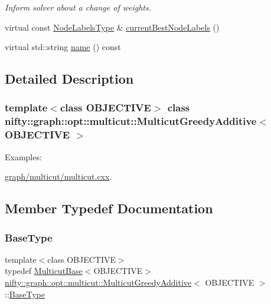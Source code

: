 \begin{DoxyCompactItemize}
\begin{DoxyCompactList}\small\item\em Inform solver about a change of weights. \end{DoxyCompactList}\item 
virtual const \hyperlink{classnifty_1_1graph_1_1opt_1_1multicut_1_1MulticutGreedyAdditive_a1a4aa1adf2a8d0183df965b535494225}{Node\+Labels\+Type} \& \hyperlink{classnifty_1_1graph_1_1opt_1_1multicut_1_1MulticutGreedyAdditive_a9bd0f6adfa063efebca30424c4a109f5}{current\+Best\+Node\+Labels} ()
\item 
virtual std\+::string \hyperlink{classnifty_1_1graph_1_1opt_1_1multicut_1_1MulticutGreedyAdditive_adf548d9855d44d4ec6b03aabee9f7e8d}{name} () const
\end{DoxyCompactItemize}


\subsection{Detailed Description}
\subsubsection*{template$<$class O\+B\+J\+E\+C\+T\+I\+VE$>$\newline
class nifty\+::graph\+::opt\+::multicut\+::\+Multicut\+Greedy\+Additive$<$ O\+B\+J\+E\+C\+T\+I\+V\+E $>$}

\begin{Desc}
\item[Examples\+: ]\par
\hyperlink{graph_2multicut_2multicut_8cxx-example}{graph/multicut/multicut.\+cxx}.\end{Desc}


\subsection{Member Typedef Documentation}
\mbox{\label{classnifty_1_1graph_1_1opt_1_1multicut_1_1MulticutGreedyAdditive_a78c7e5b1fb156700df39da1c09e59f18}} 
\subsubsection{\texorpdfstring{Base\+Type}{BaseType}}
{\footnotesize\ttfamily template$<$class O\+B\+J\+E\+C\+T\+I\+VE$>$ \\
typedef \hyperlink{classnifty_1_1graph_1_1opt_1_1multicut_1_1MulticutBase}{Multicut\+Base}$<$O\+B\+J\+E\+C\+T\+I\+VE$>$ \hyperlink{classnifty_1_1graph_1_1opt_1_1multicut_1_1MulticutGreedyAdditive}{nifty\+::graph\+::opt\+::multicut\+::\+Multicut\+Greedy\+Additive}$<$ O\+B\+J\+E\+C\+T\+I\+VE $>$\+::\hyperlink{classnifty_1_1graph_1_1opt_1_1multicut_1_1MulticutGreedyAdditive_a78c7e5b1fb156700df39da1c09e59f18}{Base\+Type}}


